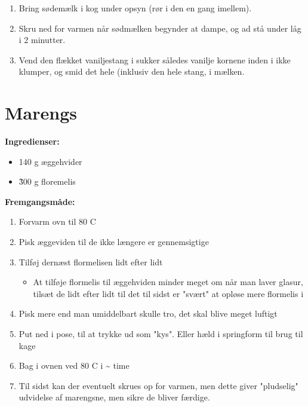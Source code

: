\documentclass{book}
\begin{document}
\begin{minipage}[t]{0.5\textwidth}
\begin{enumerate}
    \item Bring sødemælk i kog under opsyn (rør i den en gang imellem).
    \item Skru ned for varmen når sødmælken begynder at dampe, og ad stå under låg i 2 minutter.
    \item Vend den flækket vaniljestang i sukker således vanilje kornene inden i ikke klumper, og smid det hele (inklusiv den hele stang, i mælken. 
\end{enumerate}
\end{minipage}
\newpage 
\newpage \section{Marengs}
\begin{minipage}[t]{0.5\textwidth}
\textbf{Ingredienser:}
\begin{itemize}
    \item 140 g æggehvider
    \item \~ 300 g floremelis
\end{itemize}
\end{minipage}
\begin{minipage}[t]{0.5\textwidth}
\textbf{Fremgangsmåde:}
\begin{enumerate}
    \item Forvarm ovn til 80 \degree C
    \item Pisk æggeviden til de ikke længere er gennemsigtige
    \item Tilføj dernæst flormelisen lidt efter lidt
    \begin{itemize}
        \item At tilføje flormelis til æggehviden minder meget om når man laver glasur, tilsæt de lidt efter lidt til det til sidst er "svært" at opløse mere flormelis i
    \end{itemize}
    \item Pisk mere end man umiddelbart skulle tro, det skal blive meget luftigt
    \item Put ned i pose, til at trykke ud som "kys". Eller hæld i springform til brug til kage
    \item Bag i ovnen ved 80 \degree C i \~  time
    \item Til sidst kan der eventuelt skrues op for varmen, men dette giver "pludselig" udvidelse af marengsne, men sikre de bliver færdige.
\end{enumerate}
\end{minipage}
\end{document}
